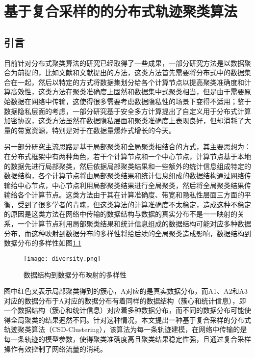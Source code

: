 \chapter{基于复合采样的的分布式轨迹聚类算法}


\section{引言}
目前针对分布式聚类算法的研究已经取得了一些成果，一部分研究方法是以数据聚合为前提的，比如文献\cite{FanA}和文献\cite{Wang2018A}提出的方法，这类方法首先需要将分布式中的数据集合在一起，然后以特定的方式将数据集划分给各个计算节点以提高聚类准确度和计算高效性，这类方法在聚类准确度上固然和数据集中式聚类相当，但是由于需要原始数据在网络中传输，这使得很多需要考虑数据隐私性的场景下变得不适用；鉴于数据隐私层面的考虑，一部分研究基于安全多方计算提出了自定义用于分布式计算加密协议，这类方法虽然在数据隐私层面和聚类准确度上表现良好，但却消耗了大量的带宽资源，特别是对于在数据量爆炸式增长的今天。

另一部分研究主流思路是基于局部聚类和全局聚类相结合的方式，其主要思想为：在分布式框架中有两种角色，若干个计算节点和一个中心节点，计算节点基于本地的数据先进行局部聚类，然后依据局部聚类结果和一些额外的统计信息组成特定的数据结构，各个计算节点将由局部聚类结果和统计信息组成的数据结构通过网络传输给中心节点，中心节点利用局部聚类结果进行全局聚类，然后将全局聚类结果传输给各个计算节点。这类方法由于其在计算准确度、带宽和隐私性层面三方面的平衡，受到了很多学者的青睐，但这类算法的计算准确度不太稳定，造成这种不稳定的原因是这类方法在网络中传输的数据结构与数据的真实分布不是一一映射的关系，一个计算节点利用局部聚类结果和统计信息组成的数据结构可能对应多种数据分布，而这种映射到数据分布的多样性将给后续的全局聚类造成影响，数据结构到数据分布的多样性如图\ref{diversity}
\begin{figure}[h]
	\texttt{[image: diversity.png]}
	\caption{数据结构到数据分布映射的多样性}
	\label{diversity}
\end{figure}

图中红色叉表示局部聚类得到的簇心，A对应的是真实数据分布，而A1、A2和A3对应的数据分布于A对应的数据分布有着同样的数据结构（簇心和统计信息），即一个数据结构（簇心和统计信息）对应着多种数据分布，而不同的数据分布可能使得全局聚类的结果迥然不同。针对这种情况，本文提出一种基于复合采样的分布式轨迹聚类算法（CSD-Clustering），该算法为每一条轨迹建模，在网络中传输的是每一条轨迹的模型参数，使得聚类准确度高且聚类结果稳定性强，且通过复合采样操作有效控制了网络流量的消耗。

